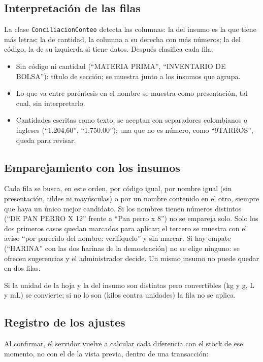 \documentclass[letterpaper,11pt]{article}
\begin{document}
\subsection{Interpretación de las filas}

La clase \texttt{ConciliacionConteo} detecta las columnas: la del insumo es la que tiene más letras; la de cantidad, la columna a su derecha con más números; la del código, la de su izquierda si tiene datos. Después clasifica cada fila:

\begin{itemize}[nosep]
\item Sin código ni cantidad (``MATERIA PRIMA'', ``INVENTARIO DE BOLSA''): título de sección; se muestra junto a los insumos que agrupa.
\item Lo que va entre paréntesis en el nombre se muestra como presentación, tal cual, sin interpretarlo.
\item Cantidades escritas como texto: se aceptan con separadores colombianos o ingleses (``1.204,60'', ``1,750.00''); una que no es número, como ``9TARROS'', queda para revisar.
\end{itemize}

\subsection{Emparejamiento con los insumos}

Cada fila se busca, en este orden, por código igual, por nombre igual (sin presentación, tildes ni mayúsculas) o por un nombre contenido en el otro, siempre que haya un único mejor candidato. Si los nombres tienen números distintos (``DE PAN PERRO X 12'' frente a ``Pan perro x 8'') no se empareja solo. Solo los dos primeros casos quedan marcados para aplicar; el tercero se muestra con el aviso ``por parecido del nombre: verifíquelo'' y sin marcar. Si hay empate (``HARINA'' con las dos harinas de la demostración) no se elige ninguno: se ofrecen sugerencias y el administrador decide. Un mismo insumo no puede quedar en dos filas.

Si la unidad de la hoja y la del insumo son distintas pero convertibles (kg y g, L y mL) se convierte; si no lo son (kilos contra unidades) la fila no se aplica.

\subsection{Registro de los ajustes}

Al confirmar, el servidor vuelve a calcular cada diferencia con el stock de ese momento, no con el de la vista previa, dentro de una transacción:
\end{document}
